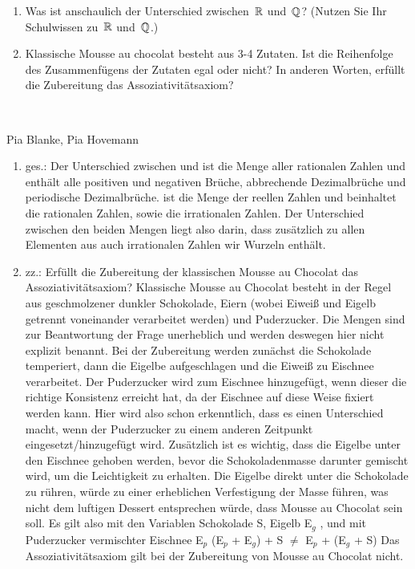 \bigskip


\begin{aufg}[4 Punkte]
\begin{enumerate}[label=$\mathrm{(\roman*)}$, ref=$\mathrm{\roman*}$]
\item Was ist anschaulich der Unterschied zwischen~$\mathbb{R}$ und~$\mathbb{Q}$? (Nutzen Sie Ihr Schulwissen zu~$\mathbb{R}$ und~$\mathbb{Q}$.)
\item Klassische Mousse au chocolat besteht aus 3-4 Zutaten. Ist die Reihenfolge des Zusammenf\"ugens der Zutaten egal oder nicht? In anderen Worten, erf\"ullt die Zubereitung das Assoziativit\"atsaxiom?
\end{enumerate}
\end{aufg}
 
\bigskip

\begin{lsg}\mbox{ }
\item [Pia Blanke, Pia Hovemann]
\begin{enumerate}[label=$\mathrm{(\roman*)}$, ref=$\mathrm{\roman*}$]
\item ges.: Der Unterschied zwischen \R und \Q
\Q  ist die Menge aller rationalen Zahlen und enthält alle positiven und negativen Brüche, abbrechende Dezimalbrüche und periodische Dezimalbrüche.
\R ist die Menge der reellen Zahlen und beinhaltet die rationalen Zahlen, sowie die irrationalen Zahlen.
Der Unterschied zwischen den beiden Mengen liegt also darin, dass \R zusätzlich zu allen Elementen aus \Q auch irrationalen Zahlen wir Wurzeln enthält.
%
\item zz.: Erfüllt die Zubereitung der klassischen Mousse au Chocolat das Assoziativitätsaxiom?
Klassische Mousse au Chocolat besteht in der Regel aus geschmolzener dunkler Schokolade, Eiern (wobei Eiweiß und Eigelb getrennt voneinander verarbeitet werden) und Puderzucker. Die Mengen sind zur Beantwortung der Frage unerheblich und werden deswegen hier nicht explizit benannt.
Bei der Zubereitung werden zunächst die Schokolade temperiert, dann die Eigelbe aufgeschlagen und die Eiweiß zu Eischnee verarbeitet. Der Puderzucker wird zum Eischnee hinzugefügt, wenn dieser die richtige Konsistenz erreicht hat, da der Eischnee auf diese Weise fixiert werden kann. Hier wird also schon erkenntlich, dass es einen Unterschied macht, wenn der Puderzucker zu einem anderen Zeitpunkt eingesetzt/hinzugefügt wird. 
Zusätzlich ist es wichtig, dass die Eigelbe unter den Eischnee gehoben werden, bevor die Schokoladenmasse darunter gemischt wird, um die Leichtigkeit zu erhalten. Die Eigelbe direkt unter die Schokolade zu rühren, würde zu einer erheblichen Verfestigung der Masse führen, was nicht dem luftigen Dessert entsprechen würde, dass Mousse au Chocolat sein soll.
Es gilt also mit den Variablen Schokolade \coloneqq S, Eigelb \coloneqq E$_{g}$ , und mit Puderzucker vermischter Eischnee \coloneqq E$_{p}$
(E$_{p}$ + E$_{g}$) + S $\neq$ E$_{p}$ + (E$_{g}$ + S)
Das Assoziativitätsaxiom gilt bei der Zubereitung von Mousse au Chocolat nicht.
\end{enumerate}
\end{lsg}
